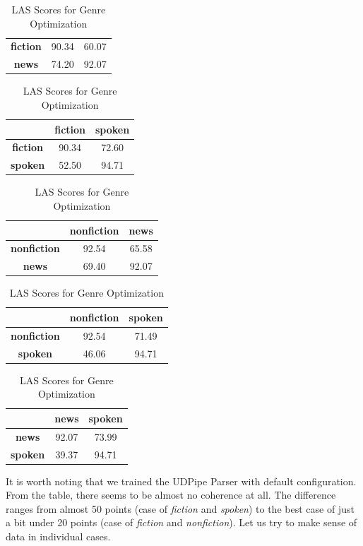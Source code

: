 \begin{table}[H]
\begin{tabular}{|c|c|c|}
    \hline
    \textbf{fiction} & 90.34 & 60.07 \\
    \textbf{news} & 74.20 & 92.07
    \\
    \hline
    \end{tabular}%
    \vspace{5mm}
    \begin{tabular}{|c|c|c|}
    \hline
         & \textbf{fiction} & \textbf{spoken} \\
    \hline
    \textbf{fiction} & 90.34 & 72.60 \\
    \textbf{spoken} & 52.50 & 94.71 \\
    \hline
    \end{tabular}%
    \vspace{5mm}
    \begin{tabular}{|c|c|c|}
    \hline
         & \textbf{nonfiction} & \textbf{news} \\
    \hline
    \textbf{nonfiction} & 92.54 & 65.58 \\
    \textbf{news} & 69.40 & 92.07 \\
    \hline
    \end{tabular}%
    \vspace{5mm}
    \begin{tabular}{|c|c|c|}
    \hline
         & \textbf{nonfiction} & \textbf{spoken} \\
    \hline
    \textbf{nonfiction} & 92.54 & 71.49 \\
    \textbf{spoken} & 46.06 & 94.71 \\
    \hline
    \end{tabular}%
    \vspace{5mm}
    \begin{tabular}{|c|c|c|}
    \hline
         & \textbf{news} & \textbf{spoken} \\
    \hline
    \textbf{news} & 92.07 & 73.99 \\
    \textbf{spoken} & 39.37 & 94.71 \\
    \hline
    \end{tabular}
    \caption{LAS Scores for Genre Optimization}
    \label{tab:las-confusion-results}
\end{table}

It is worth noting that we trained the UDPipe Parser with default configuration. From the table, there seems to be almost no coherence at all. The difference ranges from almost 50 points (case of \textit{fiction} and \textit{spoken}) to the best case of just a bit under 20 points (case of \textit{fiction} and \textit{nonfiction}). Let us try to make sense of data in individual cases.


